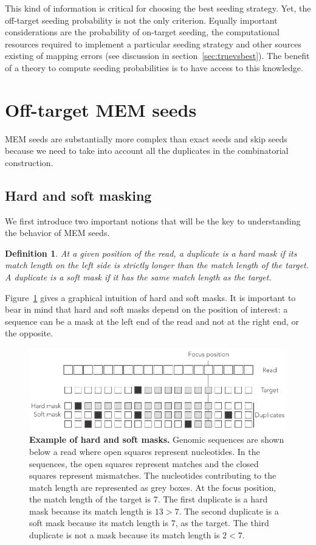 \documentclass{article}
\newtheorem{definition}{Definition}
\begin{document}
This kind of information is critical for choosing the best seeding
strategy. Yet, the off-target seeding probability is not the only
criterion. Equally important considerations are the probability of
on-target seeding, the computational resources required to implement a
particular seeding strategy and other sources existing of mapping errors
(see discussion in section~\ref{sec:truevsbest}). The benefit of a theory
to compute seeding probabilities is to have access to this knowledge.


\section{Off-target MEM seeds}
\label{sec_offMEM}

MEM seeds are substantially more complex than exact seeds and skip seeds
because we need to take into account all the duplicates in the
combinatorial construction.


\subsection{Hard and soft masking}

We first introduce two important notions that will be the key to
understanding the behavior of MEM seeds.

\begin{definition}
\label{def_mask}
At a given position of the read, a duplicate is a \emph{hard mask} if its
match length on the left side is strictly longer than the match length
of the target. A duplicate is a \emph{soft mask} if it has the same match
length as the target.
\end{definition}

Figure~\ref{fig:hard_vs_soft_masks} gives a graphical intuition of hard and
soft masks. It is important to bear in mind that hard and soft masks
depend on the position of interest: a sequence can be a mask at the left
end of the read and not at the right end, or the opposite.

\begin{figure}[h]
\centering
\includegraphics[scale=0.85]{hard_vs_soft_masks.pdf}
\caption{\textbf{Example of hard and soft masks.}
Genomic sequences are shown below a read where open squares represent
nucleotides. In the sequences, the open squares represent matches and the
closed squares represent mismatches. The nucleotides contributing to the
match length are represented as grey boxes. At the focus position, the
match length of the target is 7. The first duplicate is a hard mask
because its match length is $13>7$. The second duplicate is a soft mask
because its match length is 7, as the target. The third duplicate is not
a mask because its match length is $2<7$.}
\label{fig:hard_vs_soft_masks}
\end{figure}
\end{document}
